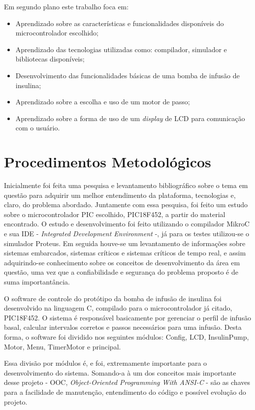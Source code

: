 Em segundo plano este trabalho foca em:
\begin{itemize}
\item Aprendizado sobre as características e funcionalidades disponíveis do microcontrolador escolhido;
\item Aprendizado das tecnologias utilizadas como: compilador, simulador e bibliotecas disponíveis;
\item Desenvolvimento das funcionalidades básicas de uma bomba de infusão de insulina;
\item Aprendizado sobre a escolha e uso de um motor de passo;
\item Aprendizado sobre a forma de uso de um \emph{display} de LCD para comunicação com o usuário.
\end{itemize}

\section{Procedimentos Metodológicos}
Inicialmente foi feita uma pesquisa e levantamento bibliográfico sobre o tema em questão para adquirir um melhor entendimento da plataforma, tecnologias e, claro, do problema abordado. Juntamente com essa pesquisa, foi feito um estudo sobre o microcontrolador PIC escolhido, PIC18F452, a partir do material encontrado. O estudo e desenvolvimento foi feito utilizando o compilador MikroC e sua IDE - \emph{Integrated Development Environment} -, já para os testes utilizou-se o simulador Proteus. Em seguida houve-se um levantamento de informações sobre sistemas embarcados, sistemas críticos e sistemas críticos de tempo real, e assim adquirindo-se conhecimento sobre os conceitos de desenvolvimento da área em questão, uma vez que a confiabilidade e segurança do problema proposto é de suma importantância.


O software de controle do protótipo da bomba de infusão de insulina foi desenvolvido na linguagem C, compilado para o microcontrolador já citado, PIC18F452. O sistema é responsável basicamente por gerenciar o perfil de infusão basal, calcular intervalos corretos e passos necessários para uma infusão. Desta forma, o
software foi dividido nos seguintes módulos: Config, LCD, InsulinPump, Motor, Menu, TimerMotor e principal. 

Essa divisão por módulos é, e foi, extremamente importante para o desenvolvimento do sistema. Somando-a à um dos conceitos mais importante desse projeto - OOC, \emph{Object-Oriented Programming With ANSI-C} - são as chaves para a facilidade de manutenção, entendimento do código e possível evolução do projeto.

